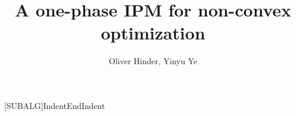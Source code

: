 \documentclass{article}
\begin{document}
\title{A one-phase IPM for non-convex optimization}
\author{Oliver Hinder, Yinyu Ye}

[SUBALG]{Indent}{EndIndent}{}{\algorithmicend\ }%

\maketitle

\newcommand{\yinyu}[1]{{\color{red} Yinyu: #1}}
\newcommand{\hinder}[1]{{\color{red}{Hinder: #1}}}

\newcommand{\algorithmicbreak}{\textbf{break}}
\newcommand{\obj}{f}
\newcommand{\cons}{a}
\newcommand{\hess}{\grad^2}
\newcommand{\nvar}{n}
\newcommand{\ncon}{m}

\newcommand{\eye}{I}



\newcommand{\parNumCor}{c_{\max}}
\newcommand{\parNumCorValue}{2}



\newcommand{\parComp}{\beta_{1}}
\newcommand{\parCompValue}{0.01}
\newcommand{\parCompInterval}{(0,1)}

\newcommand{\parCompAgg}{\beta_{2}}
\newcommand{\parCompAggValue}{0.02}
\newcommand{\parCompAggInterval}{(\parComp,1)}

\newcommand{\parMinStableStepSize}{\beta_{3}}
\newcommand{\parMinStableStepSizeValue}{2^{-5}}
\newcommand{\parMinStableStepSizeInterval}{(0,1)}

\newcommand{\parKKTReductFactor}{\beta_{4}}
\newcommand{\parKKTReductFactorValue}{0.01}
\newcommand{\parKKTReductFactorInterval}{(0,1)}

\newcommand{\parObjReductFactor}{\beta_{5}}
\newcommand{\parObjReductFactorValue}{0.2}
\newcommand{\parObjReductFactorInterval}{(0,1)}

\newcommand{\parBacktracking}{\beta_{6}}
\newcommand{\parBacktrackingValue}{0.5}
\newcommand{\parBacktrackingInterval}{(0,1)}

\newcommand{\parFracBoundary}{\beta_{7}}
\newcommand{\parFracBoundaryValue}{0.1}
\newcommand{\parFracBoundaryInterval}{(0,1)}

\newcommand{\parFracBoundaryMax}{\beta_{8}}
\newcommand{\parFracBoundaryMaxValue}{0.2}
\newcommand{\parFracBoundaryMaxInterval}{(\parFracBoundary,1)}

\newcommand{\parFracBoundaryExp}{\beta_{9}}
\newcommand{\parFracBoundaryExpValue}{1.5}
\newcommand{\parFracBoundaryExpInterval}{(1,2)}
\end{document}
